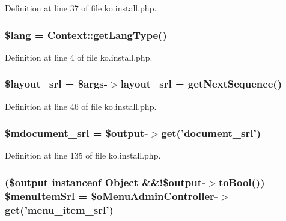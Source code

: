 Definition at line 37 of file ko.\+install.\+php.

\hypertarget{ko_8install_8php_a7714b111b644017933931ec69a154102}{
\subsubsection[{\$lang}]{\setlength{\rightskip}{0pt plus 5cm}\$lang = {\bf Context\+::get\+Lang\+Type}()}}\label{ko_8install_8php_a7714b111b644017933931ec69a154102}


Definition at line 4 of file ko.\+install.\+php.

\hypertarget{ko_8install_8php_a77889723c4aa360089caae223118d413}{
\subsubsection[{\$layout\+\_\+srl}]{\setlength{\rightskip}{0pt plus 5cm}\${\bf layout\+\_\+srl} = \$args-\/$>${\bf layout\+\_\+srl} = {\bf get\+Next\+Sequence}()}}\label{ko_8install_8php_a77889723c4aa360089caae223118d413}


Definition at line 46 of file ko.\+install.\+php.

\hypertarget{ko_8install_8php_a27c211d9a984964f84c8ffb6ea7328fc}{
\subsubsection[{\$mdocument\+\_\+srl}]{\setlength{\rightskip}{0pt plus 5cm}\$mdocument\+\_\+srl = \$output-\/$>$get('document\+\_\+srl')}}\label{ko_8install_8php_a27c211d9a984964f84c8ffb6ea7328fc}


Definition at line 135 of file ko.\+install.\+php.

\hypertarget{ko_8install_8php_a874928b6d7b44487718f1ede4a9f6ffe}{
\subsubsection[{\$menu\+Item\+Srl}]{ (\$output instanceof {\bf Object} \&\&!\$output-\/$>$to\+Bool()) \$menu\+Item\+Srl = \$o\+Menu\+Admin\+Controller-\/$>$get('menu\+\_\+item\+\_\+srl')}}\label{ko_8install_8php_a874928b6d7b44487718f1ede4a9f6ffe}



